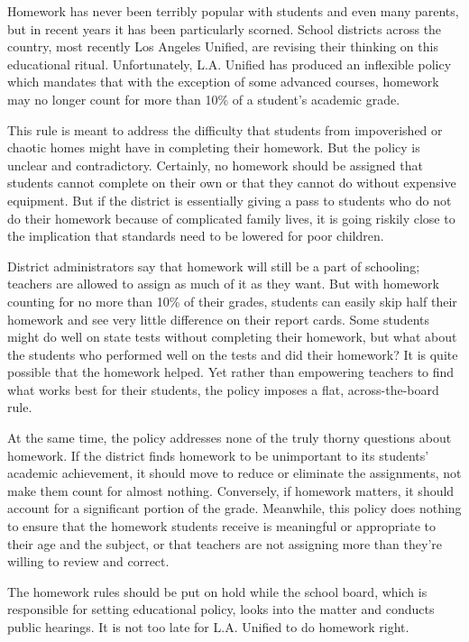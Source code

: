 \documentclass[UTF8,11pt]{ctexart}
\begin{document}
Homework has never been terribly popular with students and even many parents, but in recent years it has been particularly scorned. School districts across the country, most recently Los Angeles Unified, are revising their thinking on this educational ritual. Unfortunately, L.A. Unified has produced an inflexible policy which mandates that with the exception of some advanced courses, homework may no longer count for more than 10\% of a student’s academic grade.


This rule is meant to address the difficulty that students from impoverished or chaotic homes might have in completing their homework. But the policy is unclear and contradictory. Certainly, no homework should be assigned that students cannot complete on their own or that they cannot do without expensive equipment. But if the district is essentially giving a pass to students who do not do their homework because of complicated family lives, it is going riskily close to the implication that standards need to be lowered for poor children.


District administrators say that homework will still be a part of schooling; teachers are allowed to assign as much of it as they want. But with homework counting for no more than 10\% of their grades, students can easily skip half their homework and see very little difference on their report cards. Some students might do well on state tests without completing their homework, but what about the students who performed well on the tests and did their homework? It is quite possible that the homework helped. Yet rather than empowering teachers to find what works best for their students, the policy imposes a flat, across-the-board rule.


At the same time, the policy addresses none of the truly thorny questions about homework. If the district finds homework to be unimportant to its students’ academic achievement, it should move to reduce or eliminate the assignments, not make them count for almost nothing. Conversely, if homework matters, it should account for a significant portion of the grade. Meanwhile, this policy does nothing to ensure that the homework students receive is meaningful or appropriate to their age and the subject, or that teachers are not assigning more than they’re willing to review and correct.


The homework rules should be put on hold while the school board, which is responsible for setting educational policy, looks into the matter and conducts public hearings. It is not too late for L.A. Unified to do homework right.
\end{document}
